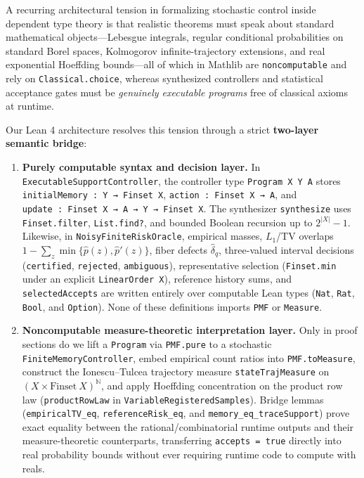 \documentclass[11pt,a4paper]{article}
\providecommand{\tightlist}{\setlength{\itemsep}{2pt}\setlength{\parskip}{0pt}}
\begin{document}
A recurring architectural tension in formalizing stochastic control
inside dependent type theory
\citep{mouraUllrich2021, mathlib2020, carneiro2019} is that realistic
theorems must speak about standard mathematical objects---Lebesgue
integrals, regular conditional probabilities on standard Borel spaces,
Kolmogorov infinite-trajectory extensions, and real exponential
Hoeffding bounds---all of which in Mathlib are \texttt{noncomputable}
and rely on \texttt{Classical.choice}, whereas synthesized controllers
and statistical acceptance gates must be \emph{genuinely executable
programs} free of classical axioms at runtime.

Our Lean 4 architecture resolves this tension through a strict
\textbf{two-layer semantic bridge}:

\begin{enumerate}
\def\labelenumi{\arabic{enumi}.}
\tightlist
\item
  \textbf{Purely computable syntax and decision layer.} In
  \texttt{ExecutableSupportController}, the controller type
  \texttt{Program\ X\ Y\ A} stores
  \texttt{initialMemory\ :\ Y\ →\ Finset\ X},
  \texttt{action\ :\ Finset\ X\ →\ A}, and
  \texttt{update\ :\ Finset\ X\ →\ A\ →\ Y\ →\ Finset\ X}. The
  synthesizer \texttt{synthesize} uses \texttt{Finset.filter},
  \texttt{List.find?}, and bounded Boolean recursion up to
  \(2^{|X|} - 1\). Likewise, in \texttt{NoisyFiniteRiskOracle},
  empirical masses, \(L_1\)/TV overlaps
  \(1 - \sum_z \min\{\widehat{p}(z), \widehat{p}'(z)\}\), fiber defects
  \(\widehat{\delta}_q\), three-valued interval decisions
  (\texttt{certified}, \texttt{rejected}, \texttt{ambiguous}),
  representative selection (\texttt{Finset.min\textquotesingle{}} under
  an explicit \texttt{LinearOrder\ X}), reference history sums, and
  \texttt{selectedAccepts} are written entirely over computable Lean
  types (\texttt{Nat}, \texttt{Rat}, \texttt{Bool}, and
  \texttt{Option}). None of these definitions imports \texttt{PMF} or
  \texttt{Measure}.
\item
  \textbf{Noncomputable measure-theoretic interpretation layer.} Only in
  proof sections do we lift a \texttt{Program} via \texttt{PMF.pure} to
  a stochastic \texttt{FiniteMemoryController}, embed empirical count
  ratios into \texttt{PMF.toMeasure}, construct the Ionescu--Tulcea
  trajectory measure \texttt{stateTrajMeasure} on
  \((X \times \mathrm{Finset}\ X)^{\mathbb{N}}\), and apply Hoeffding
  concentration on the product row law (\texttt{productRowLaw} in
  \texttt{VariableRegisteredSamples}). Bridge lemmas
  (\texttt{empiricalTV\_eq}, \texttt{referenceRisk\_eq}, and
  \texttt{memory\_eq\_traceSupport}) prove exact equality between the
  rational/combinatorial runtime outputs and their measure-theoretic
  counterparts, transferring \texttt{accepts\ =\ true} directly into
  real probability bounds without ever requiring runtime code to compute
  with reals.
\end{enumerate}
\end{document}
